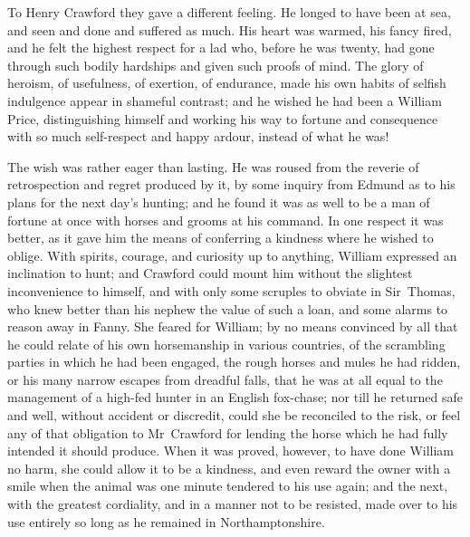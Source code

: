 To Henry Crawford they gave a different feeling. He longed to have been at sea, and seen and done and suffered as much. His heart was warmed, his fancy fired, and he felt the highest respect for a lad who, before he was twenty, had gone through such bodily hardships and given such proofs of mind. The glory of heroism, of usefulness, of exertion, of endurance, made his own habits of selfish indulgence appear in shameful contrast; and he wished he had been a William Price, distinguishing himself and working his way to fortune and consequence with so much self-respect and happy ardour, instead of what he was!

The wish was rather eager than lasting. He was roused from the reverie of retrospection and regret produced by it, by some inquiry from Edmund as to his plans for the next day's hunting; and he found it was as well to be a man of fortune at once with horses and grooms at his command. In one respect it was better, as it gave him the means of conferring a kindness where he wished to oblige. With spirits, courage, and curiosity up to anything, William expressed an inclination to hunt; and Crawford could mount him without the slightest inconvenience to himself, and with only some scruples to obviate in Sir~Thomas, who knew better than his nephew the value of such a loan, and some alarms to reason away in Fanny. She feared for William; by no means convinced by all that he could relate of his own horsemanship in various countries, of the scrambling parties in which he had been engaged, the rough horses and mules he had ridden, or his many narrow escapes from dreadful falls, that he was at all equal to the management of a high-fed hunter in an English fox-chase; nor till he returned safe and well, without accident or discredit, could she be reconciled to the risk, or feel any of that obligation to Mr~Crawford for lending the horse which he had fully intended it should produce. When it was proved, however, to have done William no harm, she could allow it to be a kindness, and even reward the owner with a smile when the animal was one minute tendered to his use again; and the next, with the greatest cordiality, and in a manner not to be resisted, made over to his use entirely so long as he remained in Northamptonshire. 